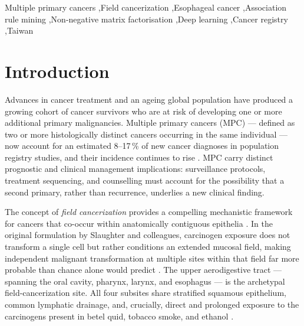 \documentclass[review,12pt]{elsarticle}
\begin{document}
\begin{frontmatter}
\begin{abstract}
\textbf{Conclusions:}
Three orthogonal unsupervised methods independently identified the same
upper aerodigestive field-cancerization domain as the dominant driver of MPC in Taiwan.
The synchronous, bidirectional presentation of upper aerodigestive pairs supports
systematic, simultaneous pan-aerodigestive endoscopic surveillance in any patient
presenting with one such SCC.
\end{abstract}

\begin{keyword}
Multiple primary cancers \sep Field cancerization \sep Esophageal cancer
\sep Association rule mining \sep Non-negative matrix factorisation
\sep Deep learning \sep Cancer registry \sep Taiwan
\end{keyword}

\end{frontmatter}

\section{Introduction}

Advances in cancer treatment and an ageing global population have produced a
growing cohort of cancer survivors who are at risk of developing one or more
additional primary malignancies. Multiple primary cancers (MPC) --- defined as
two or more histologically distinct cancers occurring in the same individual ---
now account for an estimated 8--17\,\% of new cancer diagnoses in population
registry studies, and their incidence continues to rise \cite{Vogt2017,
Coyte2014}. MPC carry distinct prognostic and clinical management implications:
surveillance protocols, treatment sequencing, and counselling must account for
the possibility that a second primary, rather than recurrence, underlies a new
clinical finding.

The concept of \textit{field cancerization} provides a compelling mechanistic
framework for cancers that co-occur within anatomically contiguous epithelia
\cite{Slaughter1953, Curtius2018}. In the original formulation by Slaughter and
colleagues, carcinogen exposure does not transform a single cell but rather
conditions an extended mucosal field, making independent malignant transformation
at multiple sites within that field far more probable than chance alone would
predict \cite{Slaughter1953}. The upper aerodigestive tract --- spanning the oral
cavity, pharynx, larynx, and esophagus --- is the archetypal field-cancerization
site. All four subsites share stratified squamous epithelium, common lymphatic
drainage, and, crucially, direct and prolonged exposure to the carcinogens present
in betel quid, tobacco smoke, and ethanol \cite{Lee2005, Chuang2008, Morris2011}.
\end{document}
